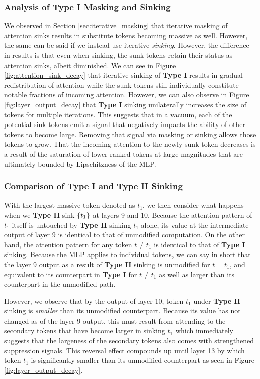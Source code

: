\subsubsection{Analysis of Type I Masking and Sinking}
We observed in Section \ref{sec:iterative_masking} that iterative masking of attention sinks results in substitute tokens becoming massive as well. However, the same can be said if we instead use iterative \textit{sinking}. However, the difference in results is that even when sinking, the sunk tokens retain their status as attention sinks, albeit diminished. We can see in Figure \ref{fig:attention_sink_decay} that iterative sinking of \textbf{Type I} results in gradual redistribution of attention while the sunk tokens still individually constitute notable fractions of incoming attention. However, we can also observe in Figure \ref{fig:layer_output_decay} that \textbf{Type I} sinking unilaterally increases the size of tokens for multiple iterations. This suggests that in a vacuum, each of the potential sink tokens emit a signal that negatively impacts the ability of other tokens to become large. Removing that signal via masking or sinking allows those tokens to grow. That the incoming attention to the newly sunk token decreases is a result of the saturation of lower-ranked tokens at large magnitudes that are ultimately bounded by Lipschitzness of the MLP.


\subsubsection{Comparison of Type I and Type II Sinking}
With the largest massive token denoted as $t_1$, we then consider what happens when we \textbf{Type II} sink $\{t_1\}$ at layers 9 and 10. Because the attention pattern of $t_1$ itself is untouched by \textbf{Type II} sinking $t_1$ alone, its value at the intermediate output of layer 9 is identical to that of unmodified computation. On the other hand, the attention pattern for any token $t \neq t_1$ is identical to that of \textbf{Type I} sinking. Because the MLP applies to individual tokens, we can say in short that the layer 9 output as a result of \textbf{Type II} sinking is unmodified for $t = t_1$, and equivalent to its counterpart in \textbf{Type I} for $t \neq t_1$ as well as larger than its counterpart in the unmodified path.

However, we observe that by the output of layer 10, token $t_1$ under \textbf{Type II} sinking is \textit{smaller} than its unmodified counterpart. Because its value has not changed as of the layer 9 output, this must result from attending to the secondary tokens that have become larger in sinking $t_1$ which immediately suggests that the largeness of the secondary tokens also comes with strengthened suppression signals. This reversal effect compounds up until layer 13 by which token $t_1$ is significantly smaller than its unmodified counterpart as seen in Figure \ref{fig:layer_output_decay}.

